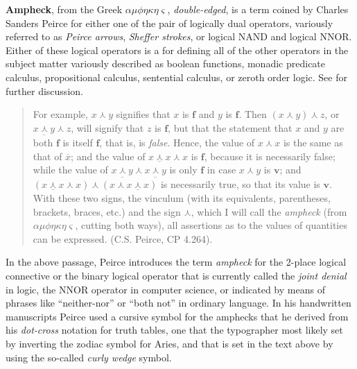 \documentclass[12pt]{article}
\begin{document}

\textbf{Ampheck}, from the Greek $\alpha\mu\phi\eta\kappa\eta\varsigma$, \textit{double-edged}, is a term coined by Charles Sanders Peirce for either one of the pair of logically dual operators, variously referred to as \textit{Peirce arrows}, \textit{Sheffer strokes}, or logical NAND and logical NNOR.  Either of these logical operators is a \textit{} for defining all of the other operators in the subject matter variously described as boolean functions, monadic predicate calculus, propositional calculus, sentential calculus, or zeroth order logic.  See \textit{} for further discussion.

\begin{quote}
For example, $x \curlywedge y$ signifies that $x$ is $\mathbf{f}$ and $y$ is $\mathbf{f}$.  Then $(x \curlywedge y) \curlywedge z$, or $\underline{x \curlywedge y} \curlywedge z$, will signify that $z$ is $\mathbf{f}$, but that the statement that $x$ and $y$ are both $\mathbf{f}$ is itself $\mathbf{f}$, that is, is \textit{false}.  Hence, the value of $x \curlywedge x$ is the same as that of $\overline{x}$;  and the value of $\underline{x \curlywedge x} \curlywedge x$ is $\mathbf{f}$, because it is necessarily false;  while the value of $\underline{x \curlywedge y} \curlywedge \underline{x \curlywedge y}$ is only $\mathbf{f}$ in case $x \curlywedge y$ is $\mathbf{v}$;  and $(\underline{x \curlywedge x} \curlywedge x) \curlywedge (x \curlywedge \underline{x \curlywedge x})$ is necessarily true, so that its value is $\mathbf{v}$.
\\
With these two signs, the vinculum (with its equivalents, parentheses, brackets, braces, etc.) and the sign $\curlywedge$, which I will call the \textit{ampheck} (from $\alpha\mu\phi\eta\kappa\eta\varsigma$, cutting both ways), all assertions as to the values of quantities can be expressed. (C.S. Peirce, CP 4.264).
\end{quote}

In the above passage, Peirce introduces the term \textit{ampheck} for the 2-place logical connective or the binary logical operator that is currently called the \textit{joint denial} in logic, the NNOR operator in computer science, or indicated by means of  phrases like ``neither-nor'' or ``both not'' in ordinary language.  In his handwritten manuscripts Peirce used a cursive symbol for the amphecks that he derived from his \textit{dot-cross} notation for truth tables, one that the typographer most likely set by inverting the zodiac symbol for Aries, and that is set in the text above by using the so-called \textit{curly wedge} symbol.
\end{document}

